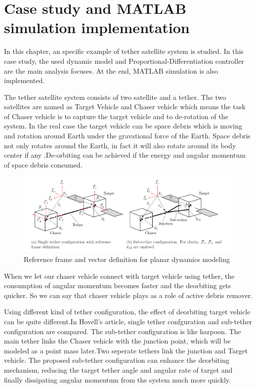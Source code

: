 \chapter{Case study and MATLAB simulation implementation}\label{section-case}
In this chapter, an specific example\cite{hovell2017experimental} of tether satellite system is studied. In this case study, the used dynamic model and Proportional-Differentiation controller are the main analysis focuses. At the end, MATLAB simulation is also implemented.

The tether satellite system consists of two satellite and a tether. The two satellites are named as Target Vehicle and Chaser vehicle which means the task of Chaser vehicle is to capture the target vehicle and to de-rotation of the system. In the real case the target vehicle can be space debris which is moving and rotation around Earth under the gravational force of the Earth. Space debris not only rotates around the Earth, in fact it will also rotate around its body center if any .De-orbiting can be achieved if the energy and angular momentum of space debris consumed.
\begin{figure}[ht]

\includegraphics[width=\textwidth]{fig/simulation/ReferenceFrame}
\caption{Reference frame and vector definition for planar dynamics modeling}

\end{figure}
When we let our chaser vehicle connect with target vehicle using tether, the consumption of angular momentum becomes faster and the deorbiting gets quicker.  
So we can say that chaser vehicle plays as a role of active debris remover.

Using different kind of tether configuration, the effect of deorbiting target vehicle can be quite different.In Hovell's article, single tether confguration and sub-tether configuration are compared. The sub-tether configuration is like harpoon. The main tether links the Chaser vehicle with the junction point, which will be modeled as a point mass later.Two seperate tethers link the junction and Target vehicle. The proposed sub-tether configuration can enhance the deorbiting mechanism, reducing the target tether angle and angular rate of target and finally dissipating angular momentum from the system much more quickly.  
